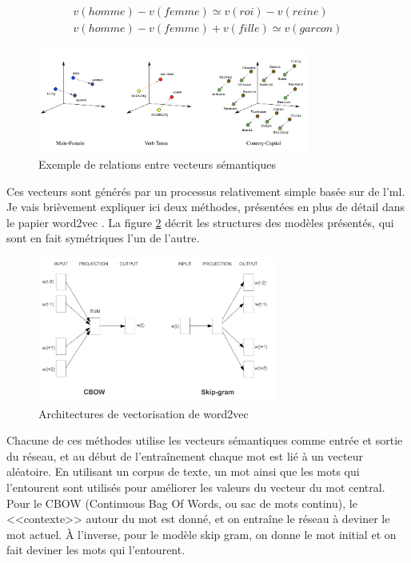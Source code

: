 \documentclass[openany, 11pt]{memoir}
\begin{document}
\begin{equation}
\begin{split}
	v(homme) - v(femme) \simeq v(roi) - v(reine)\\
	v(homme) - v(femme) + v(fille) \simeq v(garcon)
\end{split}
\end{equation}

\begin{figure}[ht]
	\centering
	\includegraphics[width=0.8\textwidth]{images/wordvec.png}
	\caption{Exemple de relations entre vecteurs sémantiques}
	\label{wordvec}
\end{figure}

Ces vecteurs sont générés par un processus relativement simple basée sur de l'\gls{ml}. Je vais brièvement expliquer ici deux méthodes, présentées en plus de détail dans le papier word2vec \cite{word2vec}. La figure \ref{word2vec} décrit les structures des modèles présentés, qui sont en fait symétriques l'un de l'autre.

\begin{figure}[ht]
	\centering
	\includegraphics[width=0.7\textwidth]{images/word2vec.png}
	\caption{Architectures de vectorisation de word2vec}
	\label{word2vec}
\end{figure}

Chacune de ces méthodes utilise les vecteurs sémantiques comme entrée et sortie du réseau, et au début de l'entraînement chaque mot est lié à un vecteur aléatoire. En utilisant un corpus de texte, un mot ainsi que les mots qui l'entourent sont utilisés pour améliorer les valeurs du vecteur du mot central. Pour le CBOW (Continuous Bag Of Words, ou sac de mots continu), le <<contexte>> autour du mot est donné, et on entraîne le réseau à deviner le mot actuel. À l'inverse, pour le modèle skip gram, on donne le mot initial et on fait deviner les mots qui l'entourent.
\end{document}
